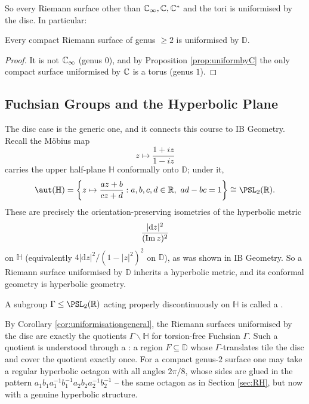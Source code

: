 \documentclass[a4paper]{scrartcl}
\newcommand{\Cinf}{\C_\infty}
\newcommand{\disc}{\mathbb{D}}
\newcommand{\Hp}{\mathbb{H}}
\newcommand{\Cs}{\C^*}
\begin{document}
So every Riemann surface other than $\Cinf, \C, \Cs$ and the tori is uniformised by the
disc. In particular:

\begin{corollary}
	Every compact Riemann surface of genus $\geq 2$ is uniformised by $\disc$.
\end{corollary}

\begin{proof}
	It is not $\Cinf$ (genus $0$), and by Proposition \ref{prop:uniformbyC} the only compact
	surface uniformised by $\mathbb{C}$ is a torus (genus $1$).
\end{proof}

\subsection{Fuchsian Groups and the Hyperbolic Plane}

The disc case is the generic one, and it connects this course to IB Geometry. Recall the
M\"obius map
$$
z \mapsto \frac{1+iz}{1-iz}
$$
carries the upper half-plane $\Hp$ conformally onto $\disc$; under it,
$$
\aut(\Hp) = \left\{z\mapsto\frac{az+b}{cz+d} : a,b,c,d\in\R,\ ad-bc=1\right\} \cong \PSL_2(\R).
$$
These are precisely the orientation-preserving isometries of the hyperbolic metric
$$
\frac{|\mathrm{d}z|^2}{(\operatorname{Im} z)^2}
$$
on $\Hp$ (equivalently $4|\mathrm{d}z|^2/(1-|z|^2)^2$ on $\disc$), as was shown in IB Geometry.
So a Riemann surface uniformised by $\disc$ inherits a hyperbolic metric, and its
conformal geometry is hyperbolic geometry.

\begin{definition}
	A subgroup $\Gamma \leq \PSL_2(\R)$ acting properly discontinuously on $\Hp$ is called
	a .
\end{definition}

By Corollary \ref{cor:uniformisationgeneral}, the Riemann surfaces uniformised by the disc
are exactly the quotients $\Gamma\backslash\Hp$ for torsion-free Fuchsian $\Gamma$. Such a
quotient is understood through a : a region $F \subseteq \disc$
whose $\Gamma$-translates tile the disc and cover the quotient exactly once. For a compact
genus-$2$ surface one may take a regular hyperbolic octagon with all angles $2\pi/8$,
whose sides are glued in the pattern $a_1b_1a_1^{-1}b_1^{-1}a_2b_2a_2^{-1}b_2^{-1}$ --
the same octagon as in Section \ref{sec:RH}, but now with a genuine hyperbolic structure.
\end{document}
